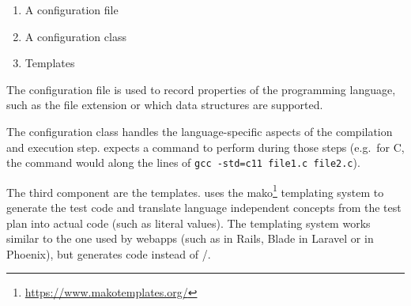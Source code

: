\begin{multicols}{2}
    \begin{enumerate}
        \item A configuration file
        \item A configuration class
        \item Templates
    \end{enumerate}
    
    The configuration file is used to record properties of the programming language, such as the file extension or which data structures are supported.
    
    The configuration class handles the language-specific aspects of the compilation and execution step.
    \tested{} expects a command to perform during those steps (e.g.\ for C, the command would along the lines of \texttt{gcc -std=c11 file1.c file2.c}).
    
    The third component are the templates.
    \tested{} uses the mako\footnote{\url{https://www.makotemplates.org/}} templating system to generate the test code and translate language independent concepts from the test plan into actual code (such as literal values).
    The templating system works similar to the one used by webapps (such as  in Rails, Blade in Laravel or  in Phoenix), but generates code instead of /.

\end{multicols}